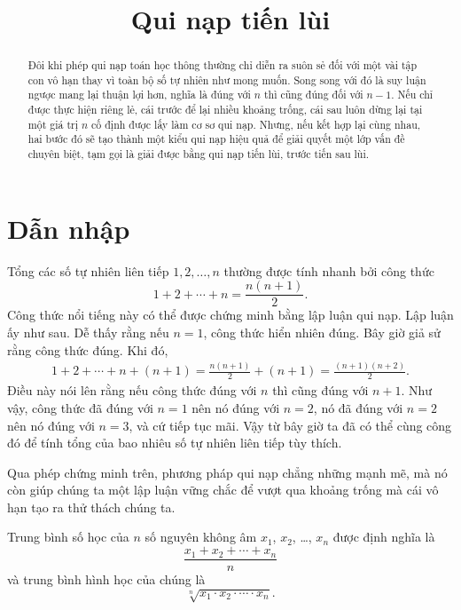 \documentclass[12pt]{article} %
\title{Qui nạp tiến lùi}
\date{}
\begin{document}
\maketitle

\begin{abstract}
    Đôi khi phép qui nạp toán học thông thường chỉ diễn ra suôn sẻ đối với một vài tập con vô hạn thay vì toàn bộ số tự nhiên như mong muốn. Song song với đó là suy luận ngược mang lại thuận lợi hơn, nghĩa là đúng với \(n\) thì cũng đúng đối với \(n-1\). Nếu chỉ được thực hiện riêng lẻ, cái trước để lại nhiều khoảng trống, cái sau luôn dừng lại tại một giá trị \(n\) cố định được lấy làm cơ sơ qui nạp. Nhưng, nếu kết hợp lại cùng nhau, hai bước đó sẽ tạo thành một kiểu qui nạp hiệu quả để giải quyết một lớp vấn đề chuyên biệt, tạm gọi là giải được bằng qui nạp tiến lùi, trước tiến sau lùi. 
\end{abstract}

\section{Dẫn nhập}
Tổng các số tự nhiên liên tiếp \(1,2,\dots,n\) thường được tính nhanh bởi công thức
\[1+2+\cdots+n=\frac{n(n+1)}{2}.\]
Công thức nổi tiếng này có thể được chứng minh bằng lập luận qui nạp. Lập luận ấy như sau. Dễ thấy rằng nếu \(n=1\), công thức hiển nhiên đúng. Bây giờ giả sử rằng công thức đúng. Khi đó, 
\begin{align*}
    1+2+\cdots+n+(n+1)=\frac{n(n+1)}{2}+(n+1)=\frac{(n+1)(n+2)}{2}.
\end{align*}
Điều này nói lên rằng nếu công thức đúng với \(n\) thì cũng đúng với \(n+1\). Như vậy, công thức đã đúng với \(n=1\) nên nó đúng với \(n=2\), nó đã đúng với \(n=2\) nên nó đúng với \(n=3\), và cứ tiếp tục mãi. Vậy từ bây giờ ta đã có thể cùng công đó để tính tổng của bao nhiêu số tự nhiên liên tiếp tùy thích.

Qua phép chứng minh trên, phương pháp qui nạp chẳng những mạnh mẽ, mà nó còn giúp chúng ta một lập luận vững chắc để vượt qua khoảng trống mà cái vô hạn tạo ra thử thách chúng ta.

Trung bình số học của \(n\) số nguyên không âm \(x_1\), \(x_2\), \dots, \(x_n\) được định nghĩa là
\[\frac{x_1+x_2+\cdots+x_n}{n}\]
và trung bình hình học của chúng là
\[\sqrt[n]{x_1\cdot x_2\cdot\cdots\cdot x_n}.\]
\end{document}
